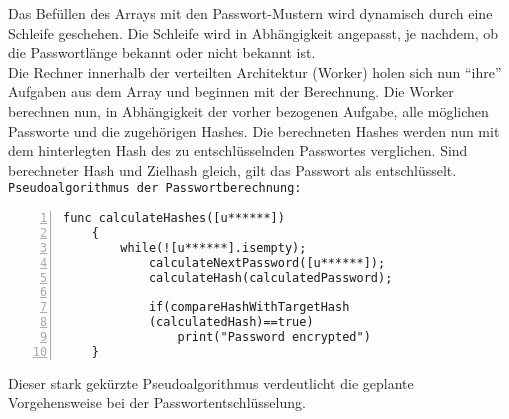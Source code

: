 Das Befüllen des Arrays mit den Passwort-Mustern wird dynamisch durch eine Schleife geschehen. Die Schleife wird in Abhängigkeit angepasst, je nachdem, ob die Passwortlänge bekannt oder nicht bekannt ist. \\
Die Rechner innerhalb der verteilten Architektur (Worker) holen sich nun \enquote{ihre} Aufgaben aus dem Array und beginnen mit der Berechnung. Die Worker berechnen nun, in Abhängigkeit der vorher bezogenen Aufgabe, alle möglichen Passworte und die zugehörigen Hashes. Die berechneten Hashes werden nun mit dem hinterlegten Hash des zu entschlüsselnden Passwortes verglichen. Sind berechneter Hash und Zielhash gleich, gilt das Passwort als entschlüsselt. \\

\texttt{Pseudoalgorithmus der Passwortberechnung:}
\begin{lstlisting}[basicstyle=\ttfamily,numbers=left,numberstyle=\footnotesize\ttfamily,backgroundcolor=\color{sourcegray}]
	func calculateHashes([u******])
	{
		while(![u******].isempty);
			calculateNextPassword([u******]);
			calculateHash(calculatedPassword);
						
			if(compareHashWithTargetHash
			(calculatedHash)==true)
				print("Password encrypted")
	}
\end{lstlisting}

Dieser stark gekürzte Pseudoalgorithmus verdeutlicht die geplante Vorgehensweise bei der Passwortentschlüsselung. \\

